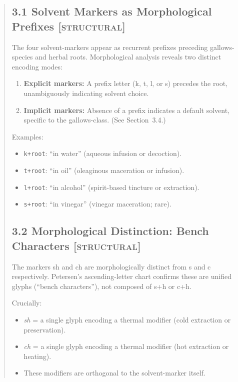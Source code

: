\documentclass[11pt,a4paper]{article}
\begin{document}
\begin{abstract}
\subsection*{3.1 Solvent Markers as Morphological Prefixes \textsc{[structural]}}

The four solvent-markers appear as recurrent prefixes preceding gallows-species and herbal roots. Morphological analysis reveals two distinct encoding modes:

\begin{enumerate}
\item \textbf{Explicit markers:} A prefix letter (k, t, l, or s) precedes the root, unambiguously indicating solvent choice.
\item \textbf{Implicit markers:} Absence of a prefix indicates a default solvent, specific to the gallows-class. (See Section~3.4.)
\end{enumerate}

Examples:
\begin{itemize}
\item \texttt{k+root}: ``in water'' (aqueous infusion or decoction).
\item \texttt{t+root}: ``in oil'' (oleaginous maceration or infusion).
\item \texttt{l+root}: ``in alcohol'' (spirit-based tincture or extraction).
\item \texttt{s+root}: ``in vinegar'' (vinegar maceration; rare).
\end{itemize}

\subsection*{3.2 Morphological Distinction: Bench Characters \textsc{[structural]}}

The markers sh and ch are morphologically distinct from s and c respectively. Petersen's ascending-letter chart confirms these are unified glyphs (``bench characters''), not composed of s+h or c+h.

Crucially:
\begin{itemize}
\item \textit{sh} = a single glyph encoding a thermal modifier (cold extraction or preservation).
\item \textit{ch} = a single glyph encoding a thermal modifier (hot extraction or heating).
\item These modifiers are orthogonal to the solvent-marker itself.
\end{itemize}


\end{abstract}
\end{document}
